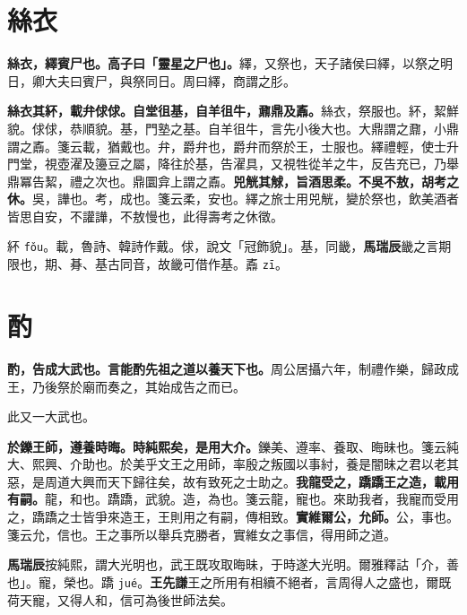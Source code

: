 \section{絲衣}


\textbf{絲衣，繹賓尸也。高子曰「靈星之尸也」。}{\footnotesize 繹，又祭也，天子諸侯曰繹，以祭之明日，卿大夫曰賓尸，與祭同日。周曰繹，商謂之肜。}

\textbf{絲衣其紑，載弁俅俅。自堂徂基，自羊徂牛，鼐鼎及鼒。}{\footnotesize 絲衣，祭服也。紑，絜鮮貌。俅俅，恭順貌。基，門塾之基。自羊徂牛，言先小後大也。大鼎謂之鼐，小鼎謂之鼒。箋云載，猶戴也。弁，爵弁也，爵弁而祭於王，士服也。繹禮輕，使士升門堂，視壺濯及籩豆之屬，降往於基，告濯具，又視牲從羊之牛，反告充已，乃舉鼎冪告絜，禮之次也。鼎圜弇上謂之鼒。}\textbf{兕觥其觩，旨酒思柔。不吳不敖，胡考之休。}{\footnotesize 吳，譁也。考，成也。箋云柔，安也。繹之旅士用兕觥，變於祭也，飲美酒者皆思自安，不讙譁，不敖慢也，此得壽考之休徵。}

\begin{quoting}紑 \texttt{fǒu}。載，魯詩、韓詩作戴。俅，說文「冠飾貌」。基，同畿，\textbf{馬瑞辰}畿之言期限也，期、朞、基古同音，故畿可借作基。鼒 \texttt{zī}。\end{quoting}

\section{酌}


\textbf{酌，告成大武也。言能酌先祖之道以養天下也。}{\footnotesize 周公居攝六年，制禮作樂，歸政成王，乃後祭於廟而奏之，其始成告之而已。}

\begin{quoting}此又一大武也。\end{quoting}

\textbf{於鑠王師，遵養時晦。時純熙矣，是用大介。}{\footnotesize 鑠美、遵率、養取、晦昧也。箋云純大、熙興、介助也。於美乎文王之用師，率殷之叛國以事紂，養是闇昧之君以老其惡，是周道大興而天下歸往矣，故有致死之士助之。}\textbf{我龍受之，蹻蹻王之造，載用有嗣。}{\footnotesize 龍，和也。蹻蹻，武貌。造，為也。箋云龍，寵也。來助我者，我寵而受用之，蹻蹻之士皆爭來造王，王則用之有嗣，傳相致。}\textbf{實維爾公，允師。}{\footnotesize 公，事也。箋云允，信也。王之事所以舉兵克勝者，實維女之事信，得用師之道。}

\begin{quoting}\textbf{馬瑞辰}按純熙，謂大光明也，武王既攻取晦昧，于時遂大光明。爾雅釋詁「介，善也」。寵，榮也。蹻 \texttt{jué}。\textbf{王先謙}王之所用有相續不絕者，言周得人之盛也，爾既荷天寵，又得人和，信可為後世師法矣。\end{quoting}

